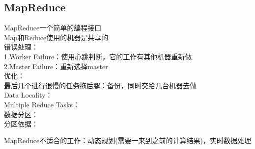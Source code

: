 \documentclass{article}
\begin{document}
\begin{CJK}{UTF8}{gbsn}
	\subsection*{MapReduce}
	MapReduce一个简单的编程接口\\
	Map和Reduce使用的机器是共享的\\
	错误处理：\\
	1.Worker Failure：使用心跳判断，它的工作有其他机器重新做\\
	2.Master Failure：重新选择master\\
	优化：\\
	最后几个进行很慢的任务拖后腿：备份，同时交给几台机器去做\\
	Data Locality：\\
	
	Multiple Reduce Tasks：\\
	
	数据分区：\\
	分区依据：
	
	
	MapReduce不适合的工作：动态规划(需要一来到之前的计算结果)，实时数据处理\\
\end{CJK}
\end{document}
